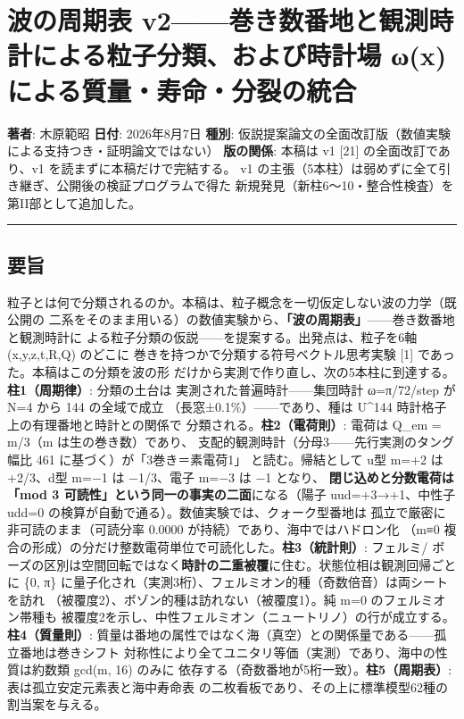 \documentclass[
]{ltjarticle}
\author{}
\date{}
\begin{document}
\section{波の周期表
v2------巻き数番地と観測時計による粒子分類、および時計場 ω(x)
による質量・寿命・分裂の統合}\label{ux6ce2ux306eux5468ux671fux8868-v2ux5dfbux304dux6570ux756aux5730ux3068ux89b3ux6e2cux6642ux8a08ux306bux3088ux308bux7c92ux5b50ux5206ux985eux304aux3088ux3073ux6642ux8a08ux5834-ux3c9x-ux306bux3088ux308bux8ceaux91cfux5bffux547dux5206ux88c2ux306eux7d71ux5408}

\textbf{著者}: 木原範昭 \textbf{日付}: 2026年8月7日 \textbf{種別}:
仮説提案論文の全面改訂版（数値実験による支持つき・証明論文ではない）
\textbf{版の関係}: 本稿は v1 {[}21{]} の全面改訂であり、v1
を読まずに本稿だけで完結する。 v1
の主張（5本柱）は弱めずに全て引き継ぎ、公開後の検証プログラムで得た
新規発見（新柱6〜10・整合性検査）を第II部として追加した。

\begin{center}\rule{0.5\linewidth}{0.5pt}\end{center}

\subsection{要旨}\label{ux8981ux65e8}

粒子とは何で分類されるのか。本稿は、粒子概念を一切仮定しない波の力学（既公開の
二系をそのまま用いる）の数値実験から、\textbf{「波の周期表」}------巻き数番地と観測時計に
よる粒子分類の仮説------を提案する。出発点は、粒子を6軸 (x,y,z,t,R,Q)
のどこに 巻きを持つかで分類する符号ベクトル思考実験 {[}1{]}
であった。本稿はこの分類を波の形
だけから実測で作り直し、次の5本柱に到達する。\textbf{柱1（周期律）}:
分類の土台は 実測された普遍時計------集団時計 ω=π/72/step が N=4 から
144 の全域で成立 （長窓±0.1\%）------であり、種は U\^{}144
時計格子上の有理番地と時計との関係で 分類される。\textbf{柱2（電荷則）}:
電荷は Q\_em = m/3（m は生の巻き数）であり、
支配的観測時計（分母3------先行実測のタング幅比 461
に基づく）が「3巻き＝素電荷1」 と読む。帰結として u型 m=+2 は +2/3、d型
m=−1 は −1/3、電子 m=−3 は −1 となり、 \textbf{閉じ込めと分数電荷は「mod
3 可読性」という同一の事実の二面}になる（陽子 uud=+3→+1、中性子 udd=0
の検算が自動で通る）。数値実験では、クォーク型番地は
孤立で厳密に非可読のまま（可読分率 0.0000
が持続）であり、海中ではハドロン化 （m≡0
複合の形成）の分だけ整数電荷単位で可読化した。\textbf{柱3（統計則）}:
フェルミ/
ボーズの区別は空間回転ではなく\textbf{時計の二重被覆}に住む。状態位相は観測回帰ごとに
\{0, π\}
に量子化され（実測3桁）、フェルミオン的種（奇数倍音）は両シートを訪れ
（被覆度2）、ボゾン的種は訪れない（被覆度1）。純 m=0
のフェルミオン帯種も
被覆度2を示し、中性フェルミオン（ニュートリノ）の行が成立する。\textbf{柱4（質量則）}:
質量は番地の属性ではなく海（真空）との関係量である------孤立番地は巻きシフト
対称性により全てユニタリ等価（実測）であり、海中の性質は約数類 gcd(m,
16) のみに 依存する（奇数番地が5桁一致）。\textbf{柱5（周期表）}:
表は孤立安定元素表と海中寿命表
の二枚看板であり、その上に標準模型62種の割当案を与える。
\end{document}
